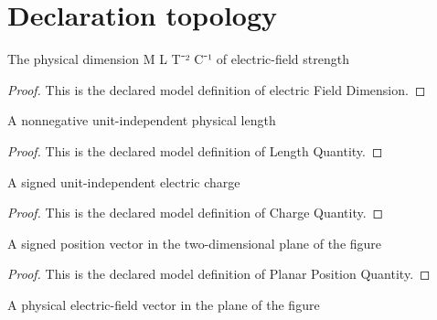 \section{Declaration topology}
\begin{definition}
  \label{def:physics:phyx-mini-0831:phyxminiproblems-problemphyxmini0831-electricfielddimension}
  The physical dimension M L T⁻² C⁻¹ of electric-field strength
\end{definition}
\begin{proof}
  This is the declared model definition of electric Field Dimension.
\end{proof}
\begin{definition}
  \label{def:physics:phyx-mini-0831:phyxminiproblems-problemphyxmini0831-lengthquantity}
  A nonnegative unit-independent physical length
\end{definition}
\begin{proof}
  This is the declared model definition of Length Quantity.
\end{proof}
\begin{definition}
  \label{def:physics:phyx-mini-0831:phyxminiproblems-problemphyxmini0831-chargequantity}
  A signed unit-independent electric charge
\end{definition}
\begin{proof}
  This is the declared model definition of Charge Quantity.
\end{proof}
\begin{definition}
  \label{def:physics:phyx-mini-0831:phyxminiproblems-problemphyxmini0831-planarpositionquantity}
  A signed position vector in the two-dimensional plane of the figure
\end{definition}
\begin{proof}
  This is the declared model definition of Planar Position Quantity.
\end{proof}
\begin{definition}
  \label{def:physics:phyx-mini-0831:phyxminiproblems-problemphyxmini0831-planarelectricfieldquantity}
  A physical electric-field vector in the plane of the figure
\end{definition}
